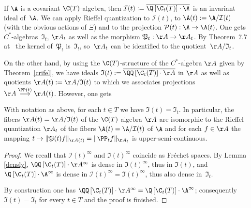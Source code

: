 If $\A$ is a covariant $\C(T)$-algebra, then $\mathcal I(t):=\overline{\Q\left[\C_t(T)\right]\cdot\A}$
is an invariant ideal of~$\A$. We can apply Rief\/fel quantization to
$\mathcal I(t)$, to $\A(t):=\A/\mathcal I(t)$ (with the obvious actions of $\Xi$) and to the projection
$\mathcal P(t):\A\rightarrow\A(t)$. One gets $C^*$-algebras~$\mathfrak I_t$, $\AA_t$ as well as the
morphism $\mathfrak P_t:\AA\rightarrow\AA_t$. By Theorem~7.7 at~\cite{Rie1} the kernel of~$\mathfrak P_t$ is~$\mathfrak I_t$, so~$\AA_t$ can be identif\/ied to the quotient~$\AA/\mathfrak I_t$.

On the other hand, by using the $\C(T)$-structure of the $C^*$-algebra $\AA$ given by Theorem~\ref{crifel}, we have ideals
$\mathfrak I(t):=\overline{\QQ\left[\C_t(T)\right]\cdot\AA}$ in $\AA$ as well as quotients $\AA(t):=\AA/\mathfrak I(t)$
to which we associates projections $\AA\overset{\PP(t)}{\longrightarrow}\AA(t)$.
However, one gets

\begin{Proposition}\label{pieligroasa}
With notation as above, for each $t\in T$ we have $\mathfrak I(t)=\mathfrak I_t$.
In particular, the fibers $\AA(t)=\AA/\mathfrak I(t)$ of  the $\C(T)$-algebra $\AA$ are isomorphic
to the Rieffel quantization $\AA_t$ of the fibers $\A(t)=\A/\mathcal I(t)$ of $\A$ and for each
$f\in\AA$ the mapping $t\mapsto\| \mathfrak P(t)f\|_{\AA(t)}=\| \PP_t f\|_{\AA_t}$
is upper-semi-continuous.
\end{Proposition}

\begin{proof}
We recall that $\mathcal I(t)^\infty$ and $\mathfrak I(t)^\infty$ coincide as Fr\'echet spaces.
By Lemma \ref{densly}, $\QQ\left[\C_t(T)\right]\cdot\AA^\infty$ is dense in $\mathfrak I(t)^\infty$,
thus in $\mathfrak I(t)$, and
$\Q\left[\C_t(T)\right]\cdot\A^\infty$ is dense in $\mathcal I(t)^\infty=\mathfrak I(t)^\infty$,
thus also dense in~$\mathfrak I_t$.

By construction one has $\QQ\left[\C_t(T)\right]\cdot\AA^\infty=\Q\left[\C_t(T)\right]\cdot\A^\infty$;
consequently $\mathfrak I(t)=\mathfrak I_t$ for every $t\in T$ and the proof is f\/inished.
\end{proof}
